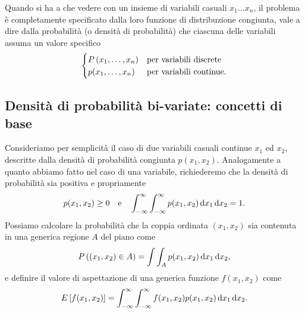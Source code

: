 Quando si ha a che vedere con un insieme di variabili casuali $x_1 \ldots x_n$,
il problema è completamente specificato dalla loro funzione di distribuzione
congiunta, vale a dire dalla probabilità (o densità di probabilità) che
ciascuna delle variabili assuma un valore specifico
\begin{align*}
  \dccases[.]{}{\prob{x_1, \ldots, x_n}}{p(x_1,\ldots, x_n)}
\end{align*}


\subsection{Densità di probabilità bi-variate: concetti di base}

Consideriamo per semplicità il caso di due variabili casuali continue
$x_1$ ed $x_2$, descritte dalla densità di probabilità congiunta $p(x_1, x_2)$.
Analogamente a quanto abbiamo fatto nel caso di una variabile, richiederemo che
la densità di probabilità sia positiva e propriamente
\begin{align*}
  p(x_1, x_2) \geq 0 \quad \text{e} \quad
  \int_{-\infty}^{\infty}\int_{-\infty}^{\infty}  p(x_1, x_2) \diff[x_1]\diff[x_2] = 1.
\end{align*}
Possiamo calcolare la probabilità che la coppia ordinata $(x_1, x_2)$
sia contenuta in una generica regione $A$ del piano come
\begin{align*}
  \prob{(x_1, x_2) \in A} = \int \int_A  p(x_1, x_2) \diff[x_1]\diff[x_2],
\end{align*}
e definire il valore di aspettazione di una generica funzione $f(x_1, x_2)$
come
\begin{align*}
  \expect{f(x_1, x_2)} = \int_{-\infty}^{\infty}\int_{-\infty}^{\infty}
  f(x_1, x_2) p(x_1, x_2) \diff[x_1]\diff[x_2].
\end{align*}


